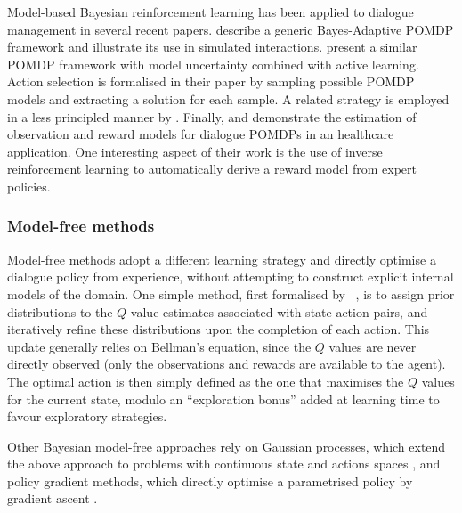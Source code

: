 Model-based Bayesian reinforcement learning has been applied to dialogue management in several recent papers.  \cite{DBLP:journals/jstsp/PngPC12} describe a generic Bayes-Adaptive POMDP framework and illustrate its use in simulated interactions. \cite{Doshi:2008:SLI:1463279.1463284} present a similar POMDP framework with model uncertainty combined with active learning.  Action selection is formalised in their paper by sampling possible POMDP models and extracting a solution for each sample. A related strategy is employed in a less principled manner by \cite{DBLP:conf/iui/AtrashP09}.  Finally, \cite{ChinaeiC12} and \cite{chinaei2012} demonstrate the estimation of observation and reward models for dialogue POMDPs in an healthcare application.  One interesting aspect of their work is the use of inverse reinforcement learning to automatically derive a reward model from expert policies.

\subsubsection*{Model-free methods}

Model-free methods adopt a different learning strategy and directly optimise a dialogue policy from experience, without attempting to construct explicit internal models of the domain. One simple method, first formalised by \ \cite{Dearden:1998}, is to assign prior distributions to the $Q$ value estimates associated with state-action pairs, and iteratively refine these distributions upon the completion of each action. This update generally relies on Bellman's equation, since the $Q$ values are never directly observed (only the observations and rewards are available to the agent). The optimal action is then simply defined as the one that maximises the $Q$ values for the current state, modulo an ``exploration bonus'' added at learning time to favour exploratory strategies. 

Other Bayesian model-free approaches rely on Gaussian processes, which extend the above approach to problems with continuous state and actions spaces \citep{Engel:2005}, and policy gradient methods, which directly optimise a parametrised policy by gradient ascent \citep{bb-ihgbps-01,GhavamzadehE06}.  


